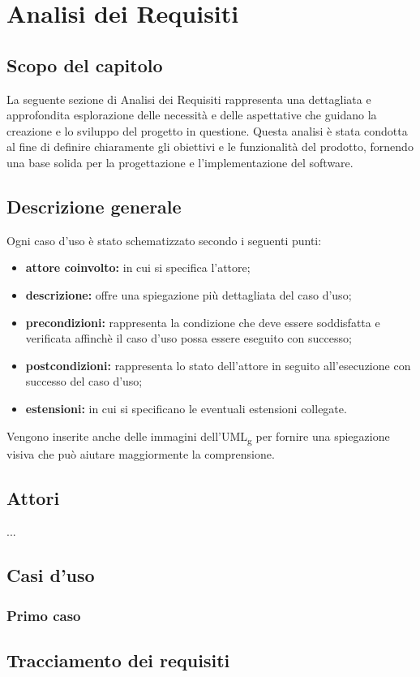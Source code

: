 \chapter{Analisi dei Requisiti}
\label{cap:analisi-requisiti}
\section{Scopo del capitolo}
La seguente sezione di Analisi dei Requisiti rappresenta una dettagliata e approfondita esplorazione delle necessità e delle aspettative che guidano la creazione e lo sviluppo del progetto in questione. Questa analisi è stata condotta al fine di definire chiaramente gli obiettivi e le funzionalità del prodotto, fornendo una base solida per la progettazione e l'implementazione del software.

\section{Descrizione generale}
Ogni caso d'uso è stato schematizzato secondo i seguenti punti:
\begin{itemize}
\item \textbf{attore coinvolto:} in cui si specifica l'attore;
\item \textbf{descrizione:} offre una spiegazione più dettagliata del caso d'uso; 
\item \textbf{precondizioni:} rappresenta la condizione che deve essere soddisfatta e verificata affinchè il caso d'uso possa essere eseguito con successo;
\item \textbf{postcondizioni:} rappresenta lo stato dell'attore in seguito all'esecuzione con successo del caso d'uso;
\item \textbf{estensioni:} in cui si specificano le eventuali estensioni collegate.
\end{itemize}
Vengono inserite anche delle immagini dell'UML\textsubscript{g} per fornire una spiegazione visiva che può aiutare maggiormente la comprensione.

\section{Attori}
...


\section{Casi d'uso}
\subsection{Primo caso}


\section{Tracciamento dei requisiti}


 

